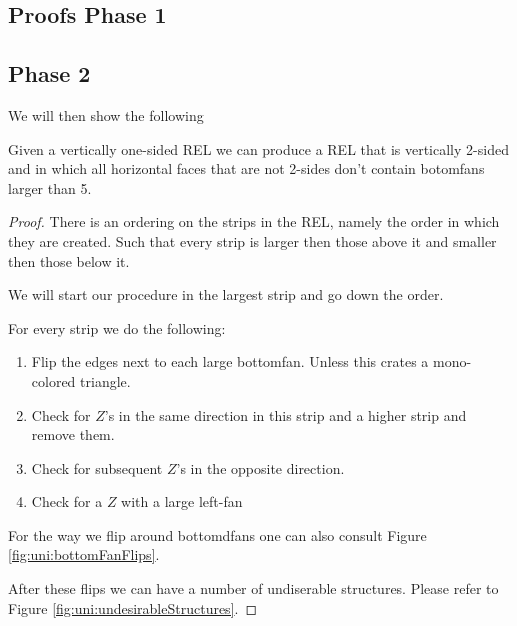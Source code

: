 \subsection{Proofs Phase 1}

\subsection{Phase 2}
We will then show the following

\begin{lemma}
  \label{lm:}
  Given a vertically one-sided REL we can produce a REL that is vertically 2-sided and in which all horizontal faces that are not 2-sides don't contain botomfans larger than 5.
\end{lemma}
\begin{proof}
  There is an ordering on the strips in the REL, namely the order in which they are created. Such that every strip is larger then those above it and smaller then those below it.

  We will start our procedure in the largest strip and go down the order.

  For every strip we do the following:
  \begin{enumerate}
    \item Flip the edges next to each large bottomfan. Unless this crates a mono-colored triangle.
    \item Check for $Z$'s  in the same direction in this strip and a higher strip and remove them.
    \item Check for subsequent $Z$'s in the opposite direction.
    \item Check for a $Z$ with a large left-fan
  \end{enumerate}

  For the way we flip around bottomdfans one can also consult Figure \ref{fig:uni:bottomFanFlips}.

  After these flips we can have a number of undiserable structures. Please refer to Figure \ref{fig:uni:undesirableStructures}.


\end{proof}
